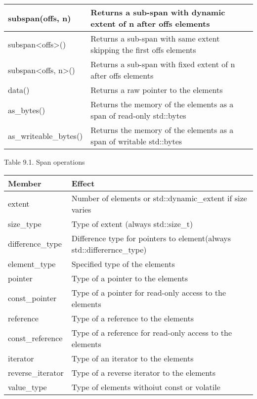 \begin{longtable}[c]{|l|l|}
subspan(offs, n)   & Returns a sub-span with dynamic extent of n after offs elements      \\ \hline
subspan\textless{}offs\textgreater{}()    & Returns a sub-span with same extent skipping the first offs elements    \\ \hline
subspan\textless{}offs, n\textgreater{}() & Returns a sub-span with fixed extent of n after offs elements           \\ \hline
data()             & Returns a raw pointer to the elements                                \\ \hline
as\_bytes()        & Returns the memory of the elements as a span of read-only std::bytes \\ \hline
as\_writeable\_bytes()                    & Returns the memory of the elements as a span of writable std::bytes     \\ \hline
\end{longtable}

\begin{center}
Table 9.1. Span operations
\end{center}

\begin{longtable}[c]{|l|l|}
\hline
\textbf{Member} & \textbf{Effect}                      \\ \hline
\endfirsthead
%
\endhead
%
extent            & Number of elements or std::dynamic\_extent if size varies              \\ \hline
size\_type      & Type of extent (always std::size\_t) \\ \hline
difference\_type  & Difference type for pointers to element(always std::differernce\_type) \\ \hline
element\_type   & Specified type of the elements       \\ \hline
pointer         & Type of a pointer to the elements    \\ \hline
const\_pointer    & Type of a pointer for read-only access to the elements                 \\ \hline
reference       & Type of a reference to the elements  \\ \hline
const\_reference  & Type of a reference for read-only access to the elements               \\ \hline
iterator        & Type of an iterator to the elements  \\ \hline
reverse\_iterator & Type of a reverse iterator to the elements                             \\ \hline
value\_type       & Type of elements withoiut const or volatile                            \\ \hline
\end{longtable}

